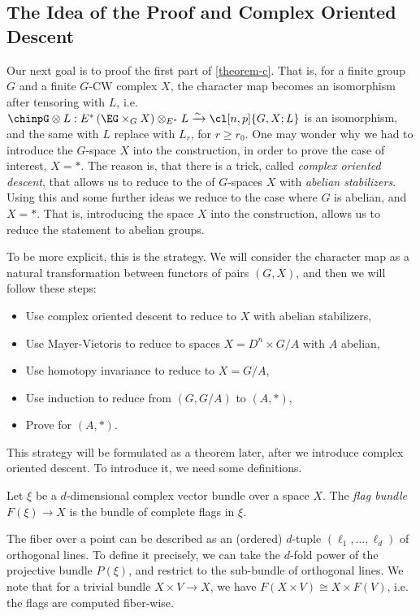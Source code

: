\subsection{The Idea of the Proof and Complex Oriented Descent}

Our next goal is to proof the first part of \ref{theorem-c}.
That is, for a finite group $G$ and a finite $G$-CW complex $X$, the character map becomes an isomorphism after tensoring with $L$, i.e.
$\chinpG \otimes L: E^*\left(\EG \times_G X\right) \otimes_{E^*} L \xrightarrow{\sim} \cl[n,p]{G,X; L}$
is an isomorphism, and the same with $L$ replace with $L_r$, for $r \geq r_0$.
One may wonder why we had to introduce the $G$-space $X$ into the construction, in order to prove the case of interest, $X = *$.
The reason is, that there is a trick, called \emph{complex oriented descent}, that allows us to reduce to the of $G$-spaces $X$ with \emph{abelian stabilizers}.
Using this and some further ideas we reduce to the case where $G$ is abelian, and $X = *$.
That is, introducing the space $X$ into the construction, allows us to reduce the statement to abelian groups.

To be more explicit, this is the strategy.
We will consider the character map as a natural transformation between functors of pairs $\left(G, X\right)$, and then we will follow these steps:
\begin{itemize}
	\item Use complex oriented descent to reduce to $X$ with abelian stabilizers,
	\item Use Mayer-Vietoris to reduce to spaces $X = D^n \times G/A$ with $A$ abelian,
	\item Use homotopy invariance to reduce to $X = G/A$,
	\item Use induction to reduce from $\left(G, G/A\right)$ to $\left(A, *\right)$,
	\item Prove for $\left(A, *\right)$.
\end{itemize}

This strategy will be formulated as a theorem later, after we introduce complex oriented descent.
To introduce it, we need some definitions.

\begin{definition}
	Let $\xi$ be a $d$-dimensional complex vector bundle over a space $X$.
	The \emph{flag bundle} $F\left(\xi\right) \to X$ is the bundle of complete flags in $\xi$.
\end{definition}

The fiber over a point can be described as an (ordered) $d$-tuple $\left(\ell_1, \dotsc, \ell_d\right)$ of orthogonal lines.
To define it precisely, we can take the $d$-fold power of the projective bundle $P\left(\xi\right)$, and restrict to the sub-bundle of orthogonal lines.
We note that for a trivial bundle $X \times V \to X$, we have $F\left(X \times V\right) \cong X \times F\left(V\right)$, i.e. the flags are computed fiber-wise.

